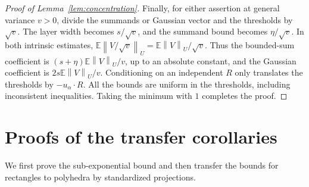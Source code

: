 \documentclass[11pt,letterpaper]{article}
\newenvironment{recovered}{}{}
\theoremstyle{remark}
\newcommand{\E}{\mathbb E}
\newcommand{\norm}[1]{\left\lVert#1\right\rVert}
\begin{document}
\begin{proof}[Proof of Lemma~\ref{lem:concentration}]
Finally, for either assertion at general variance \(v>0\), divide
the summands or Gaussian vector and the thresholds by \(\sqrt v\).
The layer width becomes \(s/\sqrt v\), and the summand bound becomes
\(\eta/\sqrt v\). In both intrinsic estimates,
\(\E\norm{V/\sqrt v}_U=\E\norm{V}_U/\sqrt v\). Thus the
bounded-sum coefficient is \((s+\eta)\E\norm{V}_U/v\), up to
an absolute constant, and the Gaussian coefficient is
\(2s\E\norm{V}_U/v\).
Conditioning on an independent \(R\) only
translates the thresholds by \(-u_\alpha\cdot R\). All the bounds
are uniform in the thresholds, including inconsistent inequalities.
Taking the minimum with \(1\) completes the proof.
\end{proof}


\section{Proofs of the transfer corollaries}\label{app:transfers}

\begin{recovered}
We first prove the sub-exponential bound and then transfer the bounds
for rectangles to polyhedra by standardized projections.
\end{recovered}
\end{document}

